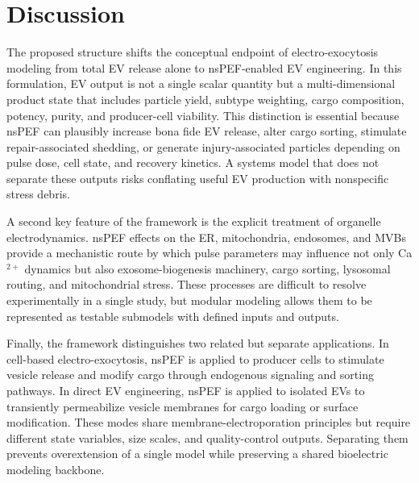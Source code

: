 \documentclass[Afour,sagev,times]{sagej}
\begin{document}



\section{Discussion}
The proposed structure shifts the conceptual endpoint of electro-exocytosis modeling from total EV release alone to nsPEF-enabled EV engineering. In this formulation, EV output is not a single scalar quantity but a multi-dimensional product state that includes particle yield, subtype weighting, cargo composition, potency, purity, and producer-cell viability. This distinction is essential because nsPEF can plausibly increase bona fide EV release, alter cargo sorting, stimulate repair-associated shedding, or generate injury-associated particles depending on pulse dose, cell state, and recovery kinetics. A systems model that does not separate these outputs risks conflating useful EV production with nonspecific stress debris.

A second key feature of the framework is the explicit treatment of organelle electrodynamics. nsPEF effects on the ER, mitochondria, endosomes, and MVBs provide a mechanistic route by which pulse parameters may influence not only Ca$^{2+}$ dynamics but also exosome-biogenesis machinery, cargo sorting, lysosomal routing, and mitochondrial stress. These processes are difficult to resolve experimentally in a single study, but modular modeling allows them to be represented as testable submodels with defined inputs and outputs.

Finally, the framework distinguishes two related but separate applications. In cell-based electro-exocytosis, nsPEF is applied to producer cells to stimulate vesicle release and modify cargo through endogenous signaling and sorting pathways. In direct EV engineering, nsPEF is applied to isolated EVs to transiently permeabilize vesicle membranes for cargo loading or surface modification. These modes share membrane-electroporation principles but require different state variables, size scales, and quality-control outputs. Separating them prevents overextension of a single model while preserving a shared bioelectric modeling backbone.

\end{document}
